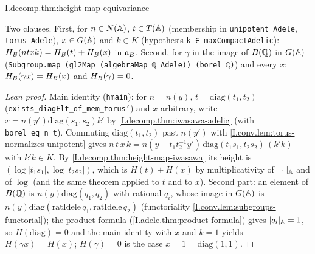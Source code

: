 \begin{theorem}
\end{theorem}
\begin{tfformal}{I.decomp.thm:height-map-equivariance}
\begin{tffidelity}
Two clauses. First, for $n\in N(\mathbb{A})$, $t\in T(\mathbb{A})$ (membership in \texttt{unipotent Adele}, \texttt{torus Adele}), $x\in G(\mathbb{A})$ and $k\in K$ (hypothesis \texttt{k ∈ maxCompactAdelic}): $H_B(ntxk)=H_B(t)+H_B(x)$ in $\mathfrak{a}_B$. Second, for $\gamma$ in the image of $B(\mathbb{Q})$ in $G(\mathbb{A})$ (\texttt{Subgroup.map (gl2Map (algebraMap ℚ Adele)) (borel ℚ)}) and every $x$: $H_B(\gamma x)=H_B(x)$ and $H_B(\gamma)=0$.
\end{tffidelity}
\end{tfformal}
\begin{proof}[Lean proof]
Main identity (\texttt{hmain}): for $n=n(y)$, $t=\mathrm{diag}(t_1,t_2)$ (\texttt{exists\_diagElt\_of\_mem\_torus'}) and $x$ arbitrary, write $x=n(y')\mathrm{diag}(s_1,s_2)k'$ by \cref{I.decomp.thm:iwasawa-adelic} (with \texttt{borel\_eq\_n\_t}). Commuting $\mathrm{diag}(t_1,t_2)$ past $n(y')$ with \cref{I.conv.lem:torus-normalizes-unipotent} gives $n\,t\,x\,k=n(y+t_1t_2^{-1}y')\,\mathrm{diag}(t_1s_1,t_2s_2)\,(k'k)$ with $k'k\in K$. By \cref{I.decomp.thm:height-map-iwasawa} its height is $(\log|t_1s_1|,\log|t_2s_2|)$, which is $H(t)+H(x)$ by multiplicativity of $|\cdot|_{\mathbb{A}}$ and of $\log$ (and the same theorem applied to $t$ and to $x$). Second part: an element of $B(\mathbb{Q})$ is $n(y)\mathrm{diag}(q_1,q_2)$ with rational $q_i$, whose image in $G(\mathbb{A})$ is $n(y)\mathrm{diag}(\mathrm{ratIdele}\,q_1,\mathrm{ratIdele}\,q_2)$ (functoriality \cref{I.conv.lem:subgroups-functorial}); the product formula (\cref{I.adele.thm:product-formula}) gives $|q_i|_{\mathbb{A}}=1$, so $H(\mathrm{diag})=0$ and the main identity with $x$ and $k=1$ yields $H(\gamma x)=H(x)$; $H(\gamma)=0$ is the case $x=1=\mathrm{diag}(1,1)$.
\end{proof}

